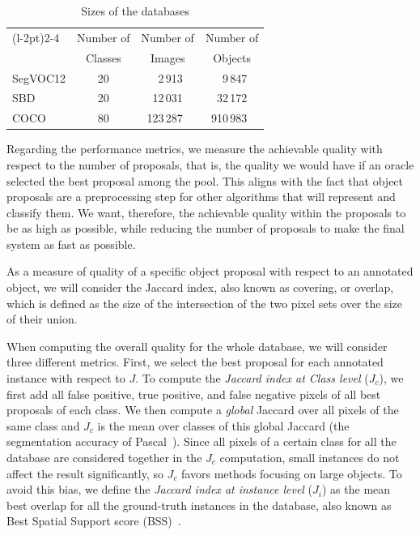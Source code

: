 \documentclass[10pt,journal,cspaper,compsoc]{IEEEtran}
\begin{document}
\begin{table}[h]
\centering
\begin{tabular}{l|ccc}
\cmidrule[\heavyrulewidth](l{-2pt}){2-4}
\multicolumn{1}{c}{}    & Number of  & Number of  & Number of  \\
\multicolumn{1}{c}{}    & Classes    &  Images    & Objects    \\
    \midrule
SegVOC12             &    20 &  \,\,\,2\,913  &   \,\,\,9\,847        \\
SBD                  &    20 &  12\,031  &  32\,172   \\
COCO                 &    80 &  123\,287\,\,\,  &    910\,983\,\,\,   \\
 \bottomrule
\end{tabular}
\caption{Sizes of the databases}
\label{tab:dbs}
\end{table}

Regarding the performance metrics, we measure the achievable quality with respect to the number of proposals, that is,
the quality we would have if an oracle selected the best proposal among the pool.
This aligns with the fact that object proposals are a preprocessing step for other algorithms that will represent and classify them.
We want, therefore, the achievable quality within the proposals to be as high as possible, while reducing the number of proposals to make the
final system as fast as possible.

As a measure of quality of a specific object proposal with respect to an annotated object, we will consider the Jaccard index,
also known as covering, or overlap, which is defined as the size of the intersection of the two pixel sets over the size of their union.

When computing the overall quality for the whole database, we will consider three different metrics.
First, we select the best proposal for each annotated instance with respect to $J$.
To compute the \textit{Jaccard index at Class level} ($J_c$), we first add all false
positive, true positive, and false negative pixels of all best proposals of each class.
We then compute a \textit{global} Jaccard over all pixels of the same class and
$J_c$ is the mean over classes of this global Jaccard (the segmentation accuracy of Pascal~\cite{Everingham2012}).
Since all pixels of a certain class for all the database are considered together in the $J_c$ computation, 
small instances do not affect the result significantly, so $J_c$ favors methods focusing on large objects.
To avoid this bias, we define the \textit{Jaccard index at instance level} ($J_i$) as the mean best overlap for all the ground-truth instances in the database,
also known as Best Spatial Support score (BSS)~\cite{Malisiewicz2007}.
\end{document}
